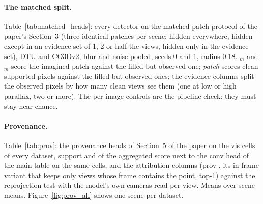 \begin{table}[h]
\centering
\caption{\textbf{Fill sensitivity of the invented surface.} The depth spread over three fills of the same hidden sphere as a detector, against native confidence on the same cells; the last two columns of each block refill one view only. 95\% cluster-bootstrap intervals over scenes.}
\label{tab:refill}
\footnotesize
\setlength{\tabcolsep}{3pt}
\resizebox{\textwidth}{!}{}
\end{table}


\paragraph{The matched split.}
Table~\ref{tab:matched_heads}: every detector on the matched-patch protocol of the paper's Section~3 (three identical patches per scene: hidden everywhere, hidden except in an evidence set of 1, 2 or half the views, hidden only in the evidence set), DTU and CO3Dv2, blur and noise pooled, seeds 0 and 1, radius 0.18. \auroc$_m$ and \cur$_m$ score the imagined patch against the filled-but-observed one; \emph{patch} scores clean supported pixels against the filled-but-observed ones; the evidence columns split the observed pixels by how many clean views see them (one at low or high parallax, two or more). The per-image controls are the pipeline check: they must stay near chance.

\begin{table}[h]
\centering
\caption{\textbf{Matched split, every detector.}}
\label{tab:matched_heads}
\footnotesize
\setlength{\tabcolsep}{3pt}
\resizebox{\textwidth}{!}{}
\end{table}

\paragraph{Provenance.}
Table~\ref{tab:prov}: the provenance heads of Section~5 of the paper on the vis cells of every dataset, support \auroc{} and \cur{} of the aggregated score next to the conv head of the main table on the same cells, and the attribution columns (prov-\auroc, its in-frame variant that keeps only views whose frame contains the point, top-1) against the reprojection test with the model's own cameras read per view. Means over scene means. Figure~\ref{fig:prov_all} shows one scene per dataset.

\begin{table}[h]
\centering
\caption{\textbf{Provenance heads.} Support score (\auroc, \cur) and attribution (prov-\auroc{} over every ordered pair of views, its in-frame variant, top-1 on supported pixels) per backbone and dataset.}
\label{tab:prov}
\footnotesize
\setlength{\tabcolsep}{3pt}
\resizebox{\textwidth}{!}{}
\end{table}

